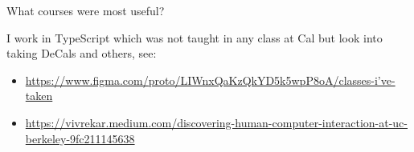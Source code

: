 What courses were most useful?
\begin{shaded}
I work in TypeScript which was not taught in any class at Cal but look into taking DeCals and others, see:
\begin{itemize}
    \item 
\href{https://www.figma.com/proto/LIWnxQaKzQkYD5k5wpP8oA/classes-i've-taken}{https://www.figma.com/proto/LIWnxQaKzQkYD5k5wpP8oA/classes-i've-taken}

    \item 
\href{https://vivrekar.medium.com/discovering-human-computer-interaction-at-uc-berkeley-9fc211145638}{https://vivrekar.medium.com/discovering-human-computer-interaction-at-uc-berkeley-9fc211145638}
\end{itemize}
\end{shaded}
